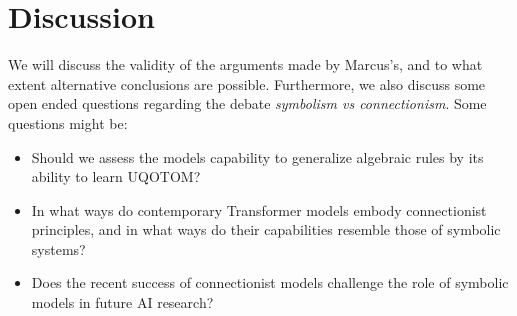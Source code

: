 \documentclass{article}
\theoremstyle{plain}
\theoremstyle{definition}
\begin{document}
\section*{Discussion}
We will discuss the validity of the arguments made by Marcus's, and to what extent alternative conclusions are possible. Furthermore, we also discuss some open ended questions regarding the debate \emph{symbolism vs connectionism}. Some questions might be:
\begin{itemize}
    \item Should we assess the models capability to generalize algebraic rules by its ability to learn UQOTOM?
    \item In what ways do contemporary Transformer models embody connectionist principles, and in what ways do their capabilities resemble those of symbolic systems?
    \item Does the recent success of connectionist models challenge the role of symbolic models in future AI research?
\end{itemize}

\printbibliography[title={References}]
\end{document}
